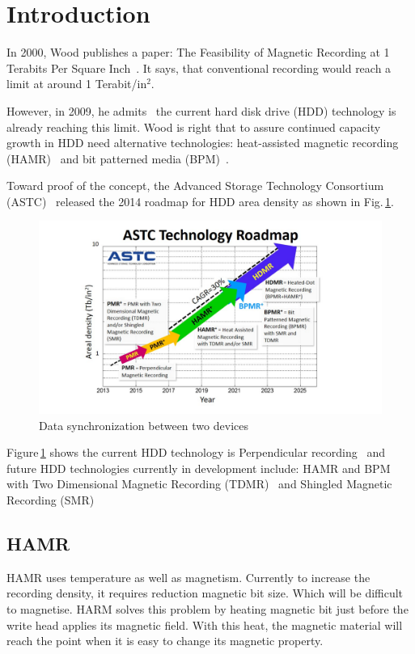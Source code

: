 \section{Introduction}
In 2000, Wood publishes a paper: The Feasibility of Magnetic Recording at 1 Terabits Per Square Inch~\cite{Wood2000}. It says, that conventional recording would reach a limit at around 1 Terabit/in$^2$.

However, in 2009, he admits~\cite{Wood2009} the current hard disk drive (HDD) technology is already reaching this limit. Wood is right that to assure continued capacity growth in HDD need alternative technologies: heat-assisted magnetic recording (HAMR)~\cite{Rottmeyer} and bit patterned media (BPM)~\cite{Terris}. 

Toward proof of the concept, the Advanced Storage Technology Consortium (ASTC)~\cite{ASTC} released the 2014 roadmap for HDD area density as shown in Fig.\,\ref{fig_astc}.

\begin{figure}[!hbt]
\includegraphics[height=0.25\textheight]{ASTC}
\caption{Data synchronization between two devices}
\label{fig_astc}
\end{figure}

Figure\,\ref{fig_astc} shows the current HDD technology is Perpendicular recording~\cite{HGST} and future HDD technologies currently in development include: HAMR and BPM with Two Dimensional Magnetic Recording (TDMR)~\cite{Krishnan} and Shingled Magnetic Recording (SMR)~\cite{Gibson}

\subsection{HAMR} 
HAMR uses temperature as well as magnetism. Currently to increase the recording density, it requires reduction magnetic bit size. Which will be difficult to magnetise. HARM solves this problem by heating magnetic bit just before the write head applies its magnetic field. With this heat, the magnetic material will reach the point when it is easy to change its magnetic property.
